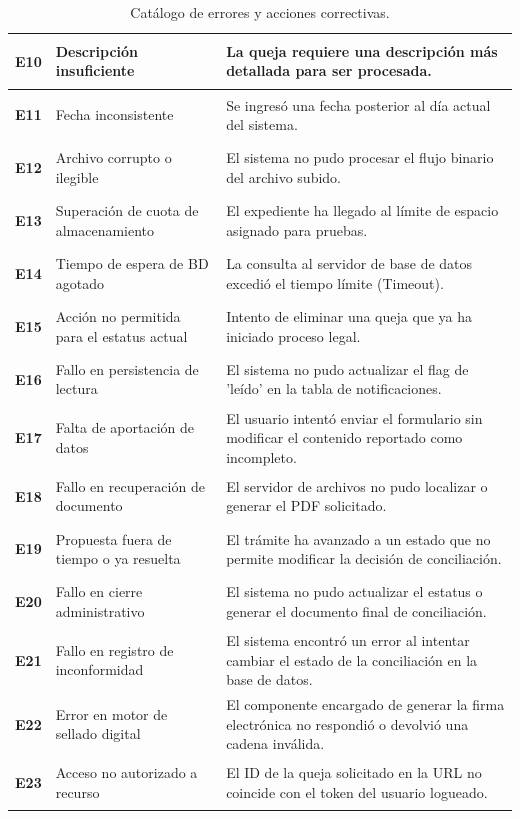 \begin{table}[htbp]
\begin{tabular}{|p{2cm}|p{6cm}|p{6cm}|}
\hypertarget{err:E10}{\textbf{E10}} & Descripción insuficiente & La queja requiere una descripción más detallada para ser procesada. \\ \hline
\hypertarget{err:E11}{\textbf{E11}} & Fecha inconsistente & Se ingresó una fecha posterior al día actual del sistema. \\ \hline
\hypertarget{err:E12}{\textbf{E12}} & Archivo corrupto o ilegible & El sistema no pudo procesar el flujo binario del archivo subido. \\ \hline
\hypertarget{err:E13}{\textbf{E13}} & Superación de cuota de almacenamiento & El expediente ha llegado al límite de espacio asignado para pruebas. \\ \hline
\hypertarget{err:E14}{\textbf{E14}} & Tiempo de espera de BD agotado & La consulta al servidor de base de datos excedió el tiempo límite (Timeout). \\ \hline
\hypertarget{err:E15}{\textbf{E15}} & Acción no permitida para el estatus actual & Intento de eliminar una queja que ya ha iniciado proceso legal. \\ \hline
\hypertarget{err:E16}{\textbf{E16}} & Fallo en persistencia de lectura & El sistema no pudo actualizar el flag de 'leído' en la tabla de notificaciones. \\ \hline
\hypertarget{err:E17}{\textbf{E17}} & Falta de aportación de datos & El usuario intentó enviar el formulario sin modificar el contenido reportado como incompleto. \\ \hline
\hypertarget{err:E18}{\textbf{E18}} & Fallo en recuperación de documento & El servidor de archivos no pudo localizar o generar el PDF solicitado. \\ \hline
\hypertarget{err:E19}{\textbf{E19}} & Propuesta fuera de tiempo o ya resuelta & El trámite ha avanzado a un estado que no permite modificar la decisión de conciliación. \\ \hline
\hypertarget{err:E20}{\textbf{E20}} & Fallo en cierre administrativo & El sistema no pudo actualizar el estatus o generar el documento final de conciliación. \\ \hline
\hypertarget{err:E21}{\textbf{E21}} & Fallo en registro de inconformidad & El sistema encontró un error al intentar cambiar el estado de la conciliación en la base de datos. \\ \hline
\hypertarget{err:E22}{\textbf{E22}} & Error en motor de sellado digital & El componente encargado de generar la firma electrónica no respondió o devolvió una cadena inválida. \\ \hline
\hypertarget{err:E23}{\textbf{E23}} & Acceso no autorizado a recurso & El ID de la queja solicitado en la URL no coincide con el token del usuario logueado. \\ \hline



\end{tabular}
\caption{Catálogo de errores y acciones correctivas.}
\end{table}